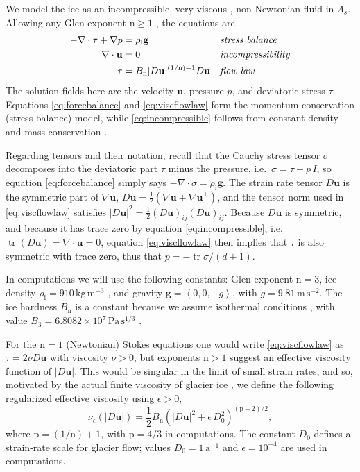 \documentclass[letterpaper,final,12pt,reqno]{amsart}
\theoremstyle{claim}
\newcommand{\eps}{\epsilon}
\newcommand{\grad}{\nabla}
\newcommand{\Div}{\nabla\cdot}
\newcommand{\trace}{\operatorname{tr}}
\newcommand{\bg}{\mathbf{g}}
\newcommand{\bu}{\mathbf{u}}
\newcommand{\rhoi}{\rho_{\text{i}}}
\newcommand{\nn}{{\text{n}}}
\newcommand{\pp}{{\text{p}}}
\numberwithin{equation}{section}
\numberwithin{figure}{section}
\numberwithin{table}{section}
\numberwithin{theorem}{section}
\begin{document}
We model the ice as an incompressible, very-viscous \cite{Acheson1990}, non-Newtonian fluid in $\Lambda_s$.  Allowing any Glen exponent $\nn\ge 1$ \cite{GreveBlatter2009}, the equations are
\begin{align}
- \nabla \cdot \tau + \nabla p &= \rhoi \bg &&\text{\emph{stress balance}} \label{eq:forcebalance} \\
\nabla \cdot \bu &= 0 &&\text{\emph{incompressibility}} \label{eq:incompressible} \\
\tau &= B_\nn |D\bu|^{(1/\nn) - 1} D\bu  &&\text{\emph{flow law}} \label{eq:viscflowlaw}
\end{align}
The solution fields here are the velocity $\bu$, pressure $p$, and deviatoric stress $\tau$.  Equations \eqref{eq:forcebalance} and \eqref{eq:viscflowlaw} form the momentum conservation (stress balance) model, while \eqref{eq:incompressible} follows from constant density and mass conservation \cite[Chapter 1]{FowlerNg2021}.

Regarding tensors and their notation, recall that the Cauchy stress tensor $\sigma$ decomposes into the deviatoric part $\tau$ minus the pressure, i.e.~$\sigma = \tau - p\,I$, so equation \eqref{eq:forcebalance} simply says $-\Div \sigma = \rhoi \bg$.  The strain rate tensor $D\bu$ is the symmetric part of $\grad \bu$, $D\bu = \frac{1}{2} \left(\grad\bu + \grad\bu^\top\right)$, and the tensor norm used in \eqref{eq:viscflowlaw} satisfies $|D\bu|^2 = \frac{1}{2} (D\bu)_{ij} (D\bu)_{ij}$.  Because $D\bu$ is symmetric, and because it has trace zero by equation \eqref{eq:incompressible}, i.e.~$\trace(D\bu)=\nabla \cdot \bu = 0$, equation \eqref{eq:viscflowlaw} then implies that $\tau$ is also symmetric with trace zero, thus that $p=-\trace \sigma / (d+1)$.

In computations we will use the following constants: Glen exponent $\nn=3$, ice density $\rhoi=910 \,\text{kg}\,\text{m}^{-3}$ \cite{Huybrechtsetal1996}, and gravity $\bg=\left<0,0,-g\right>$, with $g=9.81\,\text{m}\,\text{s}^{-2}$.  The ice hardness $B_\nn$ is a constant because we assume isothermal conditions \cite{GreveBlatter2009}, with value $B_3=6.8082\times 10^7\,\text{Pa}\,\text{s}^{1/3}$ \cite{Huybrechtsetal1996}.

For the $\nn=1$ (Newtonian) Stokes equations one would write \eqref{eq:viscflowlaw} as $\tau = 2\nu D\bu$ with viscosity $\nu>0$, but exponents $\nn>1$ suggest an effective viscosity function of $|D\bu|$.  This would be singular in the limit of small strain rates, and so, motivated by the actual finite viscosity of glacier ice \cite{GreveBlatter2009}, we define the following regularized effective viscosity using $\eps>0$,
\begin{equation}
\nu_\eps(|D\bu|) = \frac{1}{2} B_\nn \left(|D\bu|^2 + \eps\, D_0^2\right)^{(\pp-2)/2}, \label{eq:regeffvisc}
\end{equation}
where $\pp=(1/\nn)+1$, with $\pp=4/3$ in computations.  The constant $D_0$ defines a strain-rate scale for glacier flow; values $D_0 = 1 \,\text{a}^{-1}$ and $\eps = 10^{-4}$ are used in computations.
\end{document}
